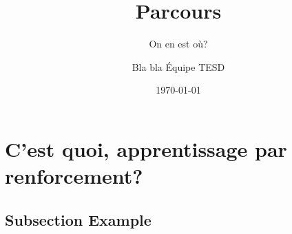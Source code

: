 \documentclass[french]{beamer}
\title[Parcours, Août 2018]{Parcours} %
\subtitle{On en est où?}
\author{Bla bla Équipe TESD} %
\institute[CRIM] %
{
CRIM \\ %
\medskip
\textit{prenom.nom@crim.ca} %
}
\date{\today} %
\begin{document}
\begin{frame}
\titlepage %
\end{frame}



\section{C'est quoi, apprentissage par renforcement?} %

\subsection{Subsection Example} %
\end{document}
